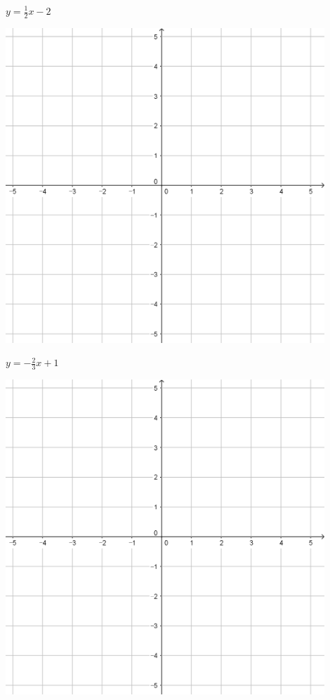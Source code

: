 \documentclass{oblivoir}
\begin{document}
\begin{minipage}{0.45\textwidth}\centering
\(y=\frac12x-2\)
\par\bigskip\includegraphics[width=0.9\textwidth]{55}
\end{minipage}
\begin{minipage}{0.45\textwidth}\centering
\(y=-\frac23x+1\)
\par\bigskip\includegraphics[width=0.9\textwidth]{55}
\end{minipage}\bigskip\bigskip\par
\end{document}
